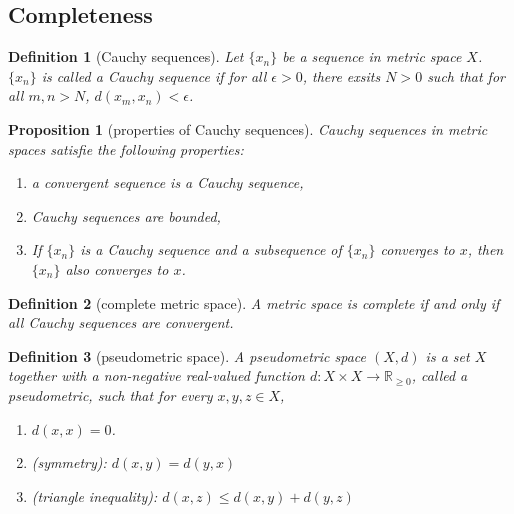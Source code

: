 \documentclass{report}
\newtheorem{definition}{Definition}[section]
\newtheorem{proposition}{Proposition}[section]
\theoremstyle{nonumberplain}
\begin{document}
\subsection{Completeness}
\begin{definition}[Cauchy sequences]
	Let $\{x_n\}$ be a sequence in metric space $X$. $\{x_n\}$ is called a \emph{Cauchy sequence} if for all $\epsilon>0$, there exsits $N>0$ such that for all $m,n>N$, $d(x_m,x_n)<\epsilon$.
\end{definition}

\begin{proposition}[properties of Cauchy sequences]
	Cauchy sequences in metric spaces satisfie the following properties:
	\begin{enumerate}
		\item a convergent sequence is a Cauchy sequence,
		\item Cauchy sequences are bounded,
		\item If $\{x_n\}$ is a Cauchy sequence and a subsequence of $\{x_n\}$ converges to $x$, then $\{x_n\}$ also converges to $x$.
	\end{enumerate}	
\end{proposition}

\begin{definition}[complete metric space]
	A metric space is \emph{complete} if and only if all Cauchy sequences are convergent.
\end{definition}

\begin{definition}[pseudometric space]
	A \emph{pseudometric space} $(X, d)$ is a set $X$ together with a non-negative real-valued function $d: X \times X \longrightarrow \mathbb{R}_{\geq 0}$, called a pseudometric, such that for every $x, y, z \in X$,
	\begin{enumerate}
		\item $d(x, x)=0$.
		\item (symmetry): $d(x, y)=d(y, x)$
		\item (triangle inequality): $d(x, z) \leq d(x, y)+d(y, z)$
	\end{enumerate}
\end{definition}
\end{document}
